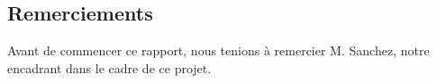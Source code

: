 \documentclass[a4paper,11pt,twoside]{article}
\begin{document}
\dosecttoc{} %
\cleardoublepage


\thispagestyle{empty} %
\subsection*{Remerciements}
Avant de commencer ce rapport, nous tenions à remercier M. Sanchez, notre encadrant dans le cadre de ce projet.
\clearpage

\thispagestyle{empty} %
\setcounter{secnumdepth}{3}
\tableofcontents
\clearpage

\setcounter{page}{1}



\clearpage

\clearpage

\clearpage

\clearpage


\clearpage



\clearpage

\clearpage
\appendix
\thispagestyle{empty} %
\renewcommand{\stctitle}{}                          %
\renewcommand\thesubsection{A\arabic{subsection}}   %
\renewcommand{\stcSSfont}{}                         %

\secttoc
\clearpage
{}




\end{document}
